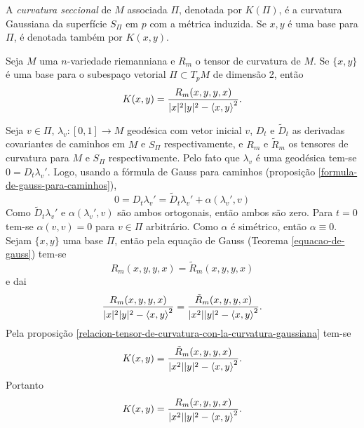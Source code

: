 \begin{definicao}
	A \emph{curvatura seccional} de $M$ associada $\Pi$, denotada por $K(\Pi)$, é a curvatura Gaussiana da superfície $S_{\Pi}$ em $p$ com a métrica induzida. Se $x,y$ é uma base para $\Pi$, é denotada também por $K(x,y)$.
\end{definicao}

\begin{proposicao}
	Seja $M$ uma $n$-variedade riemanniana e
	$R_m$ o tensor de curvatura de $M$.
	Se $\{ x,y \}$ é uma base para o subespaço vetorial $\Pi \subset T_p M$ de dimensão 2, então
	\begin{equation*}
	K(x,y) = \frac{R_m(x,y,y,x)}{|x|^2 |y|^2 - \left\langle x,y \right\rangle^2}.
	\end{equation*}
\end{proposicao}

\begin{demonstracao}
	Seja $v \in \Pi$,
	$\lambda_v: [0,1] \rightarrow M$ geodésica com vetor inicial $v$,
	$D_t$ e $\tilde{D}_t$ as derivadas covariantes de caminhos em $M$ e $S_{\Pi}$ respectivamente, e
	$R_m$ e $\tilde{R}_m$ os tensores de curvatura para $M$ e $S_{\Pi}$ respectivamente.
	Pelo fato que $\lambda_v$ é uma geodésica tem-se $0 = D_t \lambda_v'$. Logo, usando a fórmula de Gauss para caminhos (proposição \ref{formula-de-gauss-para-caminhos}),
	\begin{equation*}
	0 = D_t \lambda_v' = \tilde{D}_t \lambda_v' + \alpha(\lambda_v', v)
	\end{equation*}
	Como $\tilde{D}_t \lambda_v'$ e $\alpha(\lambda_v',v)$ são ambos ortogonais, então ambos são zero. Para $t=0$ tem-se $\alpha(v,v) = 0$ para $v \in \Pi$ arbitrário. Como $\alpha$ é simétrico, então $\alpha \equiv 0$.
	Sejam $\{x,y\}$ uma base $\Pi$, então pela equação de Gauss (Teorema \ref{equacao-de-gauss}) tem-se
	\begin{equation*}
	R_m(x,y,y,x) = \tilde{R}_m(x,y,y,x)
	\end{equation*}
	e dai
	\begin{equation*}
	\frac{R_m(x,y,y,x)}{|x|^2 |y|^2 - \left\langle x,y \right\rangle^2} = \frac{\tilde{R}_m(x,y,y,x)}{|x^2| |y|^2 - \left\langle x,y \right\rangle^2}.
	\end{equation*}
	Pela proposição \ref{relacion-tensor-de-curvatura-con-la-curvatura-gaussiana} tem-se
	\begin{equation*}
	K(x,y) = \frac{\tilde{R}_m(x,y,y,x)}{|x^2| |y|^2 - \left\langle x,y \right\rangle^2}.
	\end{equation*}
	Portanto
	\begin{equation*}
	K(x,y) = \frac{R_m(x,y,y,x)}{|x^2| |y|^2 - \left\langle x,y \right\rangle^2}.
	\end{equation*}
\end{demonstracao}

